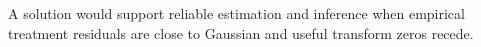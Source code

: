 A solution would support reliable estimation and inference when empirical treatment residuals are close to Gaussian and useful transform zeros recede.